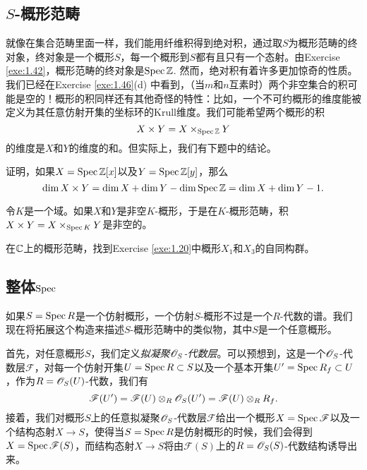 \subsection{\texorpdfstring{$S$}{S}\hyp 概形范畴}\label{s:1.3.2}

就像在集合范畴里面一样，我们能用纤维积得到绝对积，通过取$S$为概形范畴的终对象，终对象是一个概形$S$，每一个概形到$S$都有且只有一个态射。由Exercise \ref{exe:1.42}，概形范畴的终对象是$\operatorname{Spec} \mathbb{Z}$. 然而，绝对积有着许多更加惊奇的性质。我们已经在Exercise \ref{exe:1.46}(d) 中看到，（当$m$和$n$互素时）两个非空集合的积可能是空的！概形的积同样还有其他奇怪的特性：比如，一个不可约概形的维度能被定义为其任意仿射开集的坐标环的Krull维度。我们可能希望两个概形的积
\[
	X\times Y=X\times_{\operatorname{Spec} \mathbb{Z}} Y
\]
的维度是$X$和$Y$的维度的和。但实际上，我们有下题中的结论。

\begin{exe}\label{exe:1.48}
证明，如果$X=\operatorname{Spec} \mathbb{Z}[x]$以及$Y=\operatorname{Spec} \mathbb{Z}[y]$，那么
\[
	\dim X\times Y=\dim X+\dim Y-\dim \operatorname{Spec} \mathbb{Z}=\dim X+\dim Y-1.
\]
\end{exe}

\nottran

\begin{exe}\label{exe:1.49}
令$K$是一个域。如果$X$和$Y$是非空$K$\hyp 概形，于是在$K$\hyp 概形范畴，积$X\times Y=X\times_{\operatorname{Spec} K}Y$是非空的。
\end{exe}

\begin{exe}\label{exe:1.50}
在$\mathbb{C}$上的概形范畴，找到Exercise \ref{exe:1.20}中概形$X_1$和$X_3$的自同构群。
\end{exe}

\subsection{整体$\operatorname{Spec}$} \label{s:1.3.3}

如果$S=\operatorname{Spec} R$是一个仿射概形，一个仿射$S$-概形不过是一个$R$-代数的谱。我们现在将拓展这个构造来描述$S$-概形范畴中的类似物，其中$S$是一个任意概形。

首先，对任意概形$S$，我们定义\textit{拟凝聚$\mathscr{O}_S$-代数层}。可以预想到，这是一个$\mathscr{O}_S$-代数层$\mathscr F$，对每一个仿射开集$U=\operatorname{Spec} R\subset S$以及一个基本开集$U'=\operatorname{Spec} R_f\subset U$，作为$R=\mathscr{O}_S(U)$-代数，我们有
\[
	\mathscr F(U')=\mathscr F(U)\otimes_R \mathscr{O}_S(U')=\mathscr F(U)\otimes_R R_f.
\]
接着，我们对概形$S$上的任意拟凝聚$\mathscr{O}_S$-代数层$\mathscr F$给出一个概形$X=\operatorname{Spec} \mathscr F$以及一个结构态射$X\to S$，使得当$S=\operatorname{Spec} R$是仿射概形的时候，我们会得到$X=\operatorname{Spec} \mathscr F(S)$，而结构态射$X\to S$将由$\mathscr F(S)$上的$R=\mathscr{O}_S(S)$-代数结构诱导出来。

